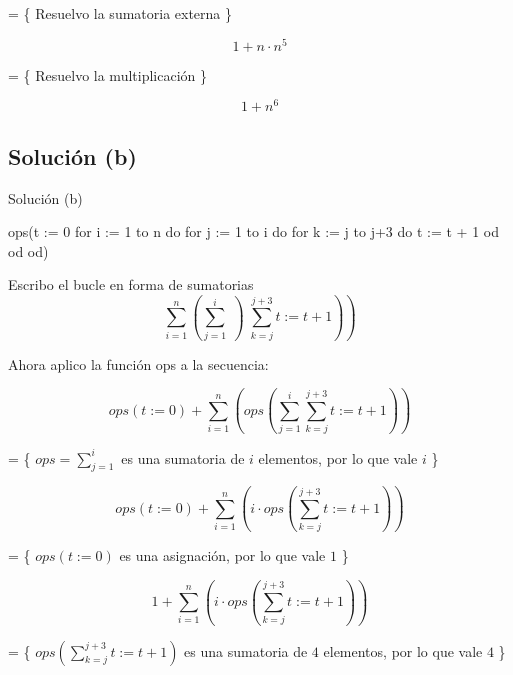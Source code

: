 = \{ Resuelvo la sumatoria externa \}

\begin{equation*}
  1 + n \cdot n^5
\end{equation*}

= \{ Resuelvo la multiplicación \}

\begin{equation*}
  1 + n^6
\end{equation*}

\subsection{Solución (b)}

\begin{codebox}{Solución (b)}
\begin{pascallike}
ops(t := 0
for i := 1 to n do
    for j := 1 to i do
    for k := j to j+3 do
        t := t + 1
    od
    od
od)
\end{pascallike}
\end{codebox}

Escribo el bucle en forma de sumatorias
\begin{equation*}
  \sum_{i=1}^{n} \left(  \sum_{j=1}^{i} \left) \sum_{k=j}^{j+3} t := t+1 \right) \right)
\end{equation*}

Ahora aplico la función ops a la secuencia:

\begin{equation*}
  ops(t := 0) + \sum_{i=1}^{n} \left(  ops\left(\sum_{j=1}^{i} \sum_{k=j}^{j+3} t := t+1 \right) \right)
\end{equation*}

= \{ $ops=\sum_{j=1}^{i}$ es una sumatoria de $i$ elementos, por lo que vale $i$ \}

\begin{equation*}
  ops(t := 0) + \sum_{i=1}^{n} \left(  i \cdot ops \left(\sum_{k=j}^{j+3} t := t+1 \right) \right)
\end{equation*}

= \{ $ops(t := 0)$ es una asignación, por lo que vale $1$ \}

\begin{equation*}
  1 + \sum_{i=1}^{n} \left(  i \cdot ops \left(\sum_{k=j}^{j+3} t := t+1 \right) \right)
\end{equation*}

= \{ $ops \left(\sum_{k=j}^{j+3} t := t+1 \right)$ es una sumatoria de $4$ elementos, por lo que vale $4$ \}

